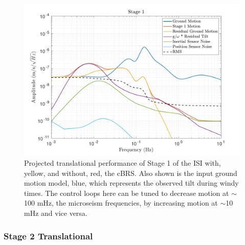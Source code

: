 \documentclass [12pt, proquest]{uwthesis}[2019]
\begin{document}
\begin{figure}[!h]
\begin{center}
\includegraphics[width=\textwidth]{cBRS_Model_ST1X.pdf}
\caption[Projected translational performance of Stage 1 of the ISI]{Projected translational performance of Stage 1 of the ISI with, yellow, and without, red, the cBRS. Also shown is the input ground motion model, blue, which represents the observed tilt during windy times. The control loops here can be tuned to decrease motion at $\sim$100 mHz, the microseism frequencies, by increasing motion at $\sim$10 mHz and vice versa.}
\label{cBRS1X}
\end{center}
\end{figure}

\subsubsection{Stage 2 Translational}
\end{document}

